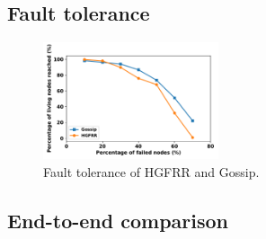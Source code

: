 \subsection{Fault tolerance}
\begin{figure}[ht]
	\centering
	  \includegraphics[width=0.46\textwidth]{figures/hgfr_ourgossip_fault.pdf}

	  \caption{Fault tolerance of HGFRR and Gossip.}
	  \label{fig_hgfr_gossip_ft}
	  \vspace{-0.5cm}
  \end{figure}

\subsection{End-to-end comparison}

